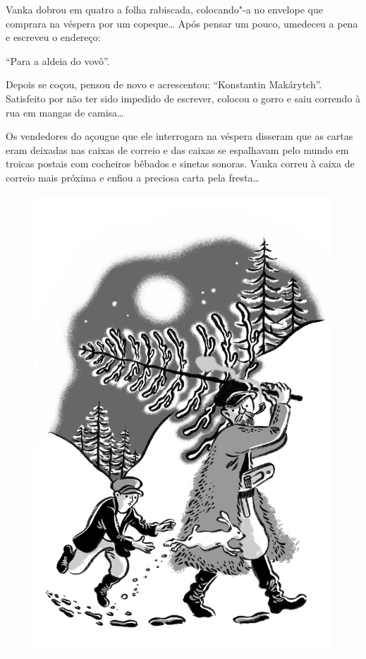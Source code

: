 Vanka dobrou em quatro a folha rabiscada, colocando"-a no envelope que
comprara na véspera por um copeque\ldots{} Após pensar um pouco, umedeceu a
pena e escreveu o endereço:

``Para a aldeia do vovô''.

Depois se coçou, pensou de novo e acrescentou: ``Konstantin Makárytch''.
Satisfeito por não ter sido impedido de escrever, colocou o gorro e saiu
correndo à rua em mangas de camisa\ldots{}

Os vendedores do açougue que ele interrogara na véspera disseram que as
cartas eram deixadas nas caixas de correio e das caixas se espalhavam
pelo mundo em troicas postais com cocheiros bêbados e sinetas sonoras.
Vanka correu à caixa de correio mais próxima e enfiou a preciosa carta
pela fresta\ldots{}

\begin{figure}[ht!]
\vspace*{-1.6cm}
\hspace*{-1.8cm}\includegraphics{./imgs/cena6.jpg}
\end{figure}

